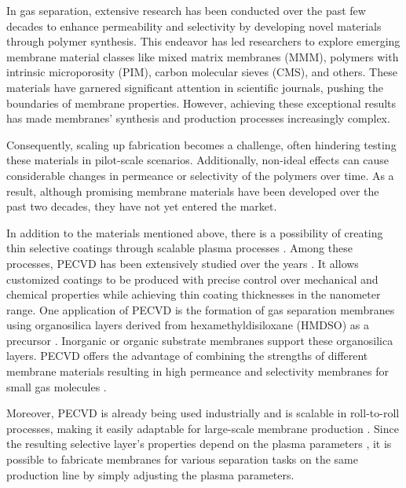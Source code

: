 \documentclass[AMA,STIX2COL]{WileyNJD-v2} %
\begin{document}
In gas separation, extensive research has been conducted over the past few decades to enhance permeability and selectivity by developing novel materials through polymer synthesis. This endeavor has led researchers to explore emerging membrane material classes like mixed matrix membranes (MMM), polymers with intrinsic microporosity (PIM), carbon molecular sieves (CMS), and others. These materials have garnered significant attention in scientific journals, pushing the boundaries of membrane properties. However, achieving these exceptional results has made membranes' synthesis and production processes increasingly complex.

Consequently, scaling up fabrication becomes a challenge, often hindering testing these materials in pilot-scale scenarios. Additionally, non-ideal effects can cause considerable changes in permeance or selectivity of the polymers over time. As a result, although promising membrane materials have been developed over the past two decades, they have not yet entered the market.

In addition to the materials mentioned above, there is a possibility of creating thin selective coatings through scalable plasma processes \cite{roualdes20171}. Among these processes, PECVD has been extensively studied over the years \cite{li1999gas}. It allows customized coatings to be produced with precise control over mechanical and chemical properties while achieving thin coating thicknesses in the nanometer range. One application of PECVD is the formation of gas separation membranes using organosilica layers derived from hexamethyldisiloxane (HMDSO) as a precursor \cite{li1999gas,lo2010control,kafrouni2010synthesis,coustel2014insight,nagasawa2015microporous,kleines2020enhancing,kleines2022evaluation}. Inorganic \cite{kafrouni2009synthesis,tsuru20112,nagasawa2013characterization,haacke2015optimization} or organic substrate membranes \cite{li1999gas,kleines2020enhancing,kleines2021structure,kleines2022evaluation,roualdes1999gas,roualdes2002gas,bosc2003sorption,ngamou2013plasma,charifou2016siox,wang2017gas}support these organosilica layers. PECVD offers the advantage of combining the strengths of different membrane materials resulting in high permeance and selectivity membranes for small gas molecules \cite{nagasawa2013characterization}.

Moreover, PECVD is already being used industrially and is scalable in roll-to-roll processes, making it easily adaptable for large-scale membrane production \cite{izu1995roll}. Since the resulting selective layer's properties depend on the plasma parameters \cite{kleines2021structure,kleines2022evaluation}, it is possible to fabricate membranes for various separation tasks on the same production line by simply adjusting the plasma parameters.
\end{document}
